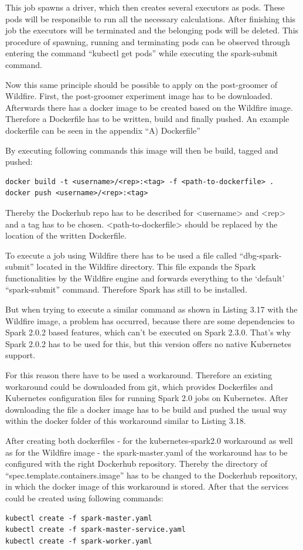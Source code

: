 This job spawns a driver, which then creates several executors as pods. These pods will be responsible to run all the necessary calculations. After finishing this job the executors will be terminated and the belonging pods will be deleted. This procedure of spawning, running and terminating pods can be observed through entering the command ``kubectl get pods'' while executing the spark-submit command.

Now this same principle should be possible to apply on the post-groomer of Wildfire. First, the post-groomer experiment image has to be downloaded. Afterwards there has a docker image to be created based on the Wildfire image. Therefore a Dockerfile has to be written, build and finally pushed. An example dockerfile can be seen in the appendix ``A) Dockerfile''

By executing following commands this image will then be build, tagged and pushed:
\begin{lstlisting}[caption={Build Wildfire docker image},captionpos=b]
docker build -t <username>/<rep>:<tag> -f <path-to-dockerfile> .
docker push <username>/<rep>:<tag>
\end{lstlisting}
Thereby the Dockerhub repo has to be described for <username> and <rep> and a tag has to be chosen. <path-to-dockerfile> should be replaced by the location of the written Dockerfile.

To execute a job using Wildfire there has to be used a file called ``dbg-spark-submit'' located in the Wildfire directory. This file expands the Spark functionalities by the Wildfire engine and forwards everything to the `default' ``spark-submit'' command. Therefore Spark has still to be installed.

But when trying to execute a similar command as shown in Listing 3.17 with the Wildfire image, a problem has occurred, because there are some dependencies to Spark 2.0.2 based features, which can't be executed on Spark 2.3.0. That's why Spark 2.0.2 has to be used for this, but this version offers no native Kubernetes support.

For this reason there have to be used a workaround. Therefore an existing workaround could be downloaded from git, which provides Dockerfiles and Kubernetes configuration files for running Spark 2.0 jobs on Kubernetes. After downloading the file a docker image has to be build and pushed the usual way within the docker folder of this workaround similar to Listing 3.18.

After creating both dockerfiles - for the kubernetes-spark2.0 workaround as well as for the Wildfire image - the spark-master.yaml of the workaround has to be configured with the right Dockerhub repository. Thereby the directory of ``spec.template.containers.image'' has to be changed to the Dockerhub repository, in which the docker image of this workaround is stored. After that the services could be created using following commands:
\begin{lstlisting}[caption={Create Spark 2.0 services on Kubernetes},captionpos=b]
kubectl create -f spark-master.yaml
kubectl create -f spark-master-service.yaml
kubectl create -f spark-worker.yaml
\end{lstlisting}

